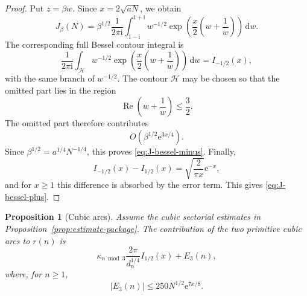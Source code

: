\documentclass[11pt]{article}
\newtheorem{proposition}[theorem]{Proposition}
\theoremstyle{remark}
\newcommand{\ii}{\mathrm i}
\newcommand{\e}{\mathrm e}
\newcommand{\dd}{\mathrm d}
\newcommand{\Repart}{\operatorname{Re}}
\begin{document}
\begin{proof}
Put $z=\beta w$. Since $x=2\sqrt{aN}$, we obtain
\[
J_\beta(N)
=
\beta^{1/2}
\frac1{2\pi\ii}
\int_{1-\ii}^{1+\ii}
w^{-1/2}
\exp\left(\frac{x}{2}\left(w+\frac1w\right)\right)\,\dd w.
\]
The corresponding full Bessel contour integral is
\[
\frac1{2\pi\ii}
\int_{\mathcal H}
w^{-1/2}
\exp\left(\frac{x}{2}\left(w+\frac1w\right)\right)\,\dd w
=
I_{-1/2}(x),
\]
with the same branch of $w^{-1/2}$. The contour $\mathcal H$ may be chosen so that the omitted part lies in the region
\[
\Repart\left(w+\frac1w\right)\leq \frac32.
\]
The omitted part therefore contributes
\[
O\left(\beta^{1/2}\e^{3x/4}\right).
\]
Since $\beta^{1/2}=a^{1/4}N^{-1/4}$, this proves \eqref{eq:J-bessel-minus}. Finally,
\[
I_{-1/2}(x)-I_{1/2}(x)
=
\sqrt{\frac{2}{\pi x}}\e^{-x},
\]
and for $x\geq1$ this difference is absorbed by the error term. This gives \eqref{eq:J-bessel-plus}.
\end{proof}

\begin{proposition}[Cubic arcs]\label{prop:cubic-arcs}
Assume the cubic sectorial estimates in Proposition~\ref{prop:estimate-package}. The contribution of the two primitive cubic arcs to $r(n)$ is
\begin{equation}\label{eq:cubic-contribution}
\kappa_{n\bmod3}
\frac{2\pi}{d_n^{1/4}}
I_{1/2}(x)
+
E_3(n),
\end{equation}
where, for $n\geq1$,
\begin{equation}\label{eq:cubic-error}
|E_3(n)|\leq250N^{1/2}\e^{7x/8}.
\end{equation}
\end{proposition}
\end{document}
